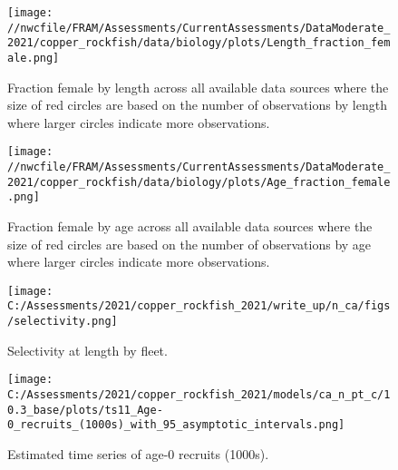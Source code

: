 \documentclass[11pt,
  english,
  a4paper,
]{article}
\begin{document}
\tagmcend\tagstructend

\clearpage


\begin{figure}
\centering
\texttt{[image: //nwcfile/FRAM/Assessments/CurrentAssessments/DataModerate\_2021/copper\_rockfish/data/biology/plots/Length\_fraction\_female.png]}
\caption{Fraction female by length across all available data sources where the size of red circles are based on the number of observations by length where larger circles indicate more observations.\label{fig:len-sex-ratio}}
\end{figure}

\tagmcend\tagstructend


\begin{figure}
\centering
\texttt{[image: //nwcfile/FRAM/Assessments/CurrentAssessments/DataModerate\_2021/copper\_rockfish/data/biology/plots/Age\_fraction\_female.png]}
\caption{Fraction female by age across all available data sources where the size of red circles are based on the number of observations by age where larger circles indicate more observations.\label{fig:age-sex-ratio}}
\end{figure}

\tagmcend\tagstructend


\begin{figure}
\centering
\texttt{[image: C:/Assessments/2021/copper\_rockfish\_2021/write\_up/n\_ca/figs/selectivity.png]}
\caption{Selectivity at length by fleet.\label{fig:selex}}
\end{figure}

\tagmcend\tagstructend


\begin{figure}
\centering
\texttt{[image: C:/Assessments/2021/copper\_rockfish\_2021/models/ca\_n\_pt\_c/10.3\_base/plots/ts11\_Age-0\_recruits\_(1000s)\_with\_95\_asymptotic\_intervals.png]}
\caption{Estimated time series of age-0 recruits (1000s).\label{fig:recruits}}
\end{figure}
\end{document}
